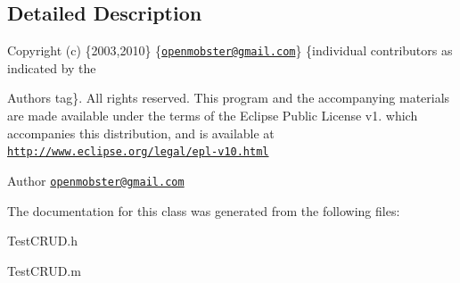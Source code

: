 \subsection{\-Detailed \-Description}
\-Copyright (c) \{2003,2010\} \{\href{mailto:openmobster@gmail.com}{\tt openmobster@gmail.\-com}\} \{individual contributors as indicated by the \begin{DoxyAuthor}{\-Authors}
tag\}. \-All rights reserved. \-This program and the accompanying materials are made available under the terms of the \-Eclipse \-Public \-License v1. which accompanies this distribution, and is available at \href{http://www.eclipse.org/legal/epl-v10.html}{\tt http\-://www.\-eclipse.\-org/legal/epl-\/v10.\-html}
\end{DoxyAuthor}
\begin{DoxyAuthor}{\-Author}
\href{mailto:openmobster@gmail.com}{\tt openmobster@gmail.\-com} 
\end{DoxyAuthor}


\-The documentation for this class was generated from the following files\-:\begin{DoxyCompactItemize}
\item 
\-Test\-C\-R\-U\-D.\-h\item 
\-Test\-C\-R\-U\-D.\-m\end{DoxyCompactItemize}
